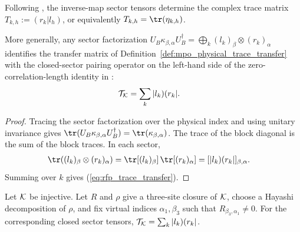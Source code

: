 \begin{definition}
    \label{def:mpdo_concrete_closed_sector_trace_matrix}
    \leanok
    Following \cite[Appendix~C.2, lines~1478--1481]{Cirac2016MPDO_arXiv},
    the inverse-map sector tensors determine the complex trace matrix
    $T_{k,h}:=(r_k|l_h)$, or equivalently $T_{k,h}=\tr(\eta_{k,h})$.
\end{definition}

\begin{lemma}
    \label{thm:mpdo_closed_sector_physical_trace_transfer}
    \leanok
    More generally, any sector factorization
    $U_B\kappa_{\beta,\alpha}U_B^\dagger
        =\bigoplus_k(l_k)_\beta\otimes(r_k)_\alpha$ identifies the transfer
    matrix of Definition~\ref{def:mpo_physical_trace_transfer} with the
    closed-sector pairing operator on the left-hand side of the
    zero-correlation-length identity in
    \cite[Appendix~C.2, lines~1489--1493]{Cirac2016MPDO_arXiv}:
    \begin{align}
        \mathcal T_{\cal K} & =\sum_k |l_k)(r_k|. \label{eq:rfp_trace_transfer}
    \end{align}
\end{lemma}

\begin{proof}
    \leanok
    Tracing the sector factorization over the physical index and using unitary
    invariance gives
    $\tr(U_B\kappa_{\beta,\alpha}U_B^\dagger)
        =\tr(\kappa_{\beta,\alpha})$.
    The trace of the block diagonal is the sum of the block traces. In each
    sector,
    \begin{align}
        \tr((l_k)_\beta\otimes(r_k)_\alpha)
         & =\tr[(l_k)_\beta]\,\tr[(r_k)_\alpha]
            =[|l_k)(r_k|]_{\beta,\alpha}. \notag
    \end{align}
    Summing over $k$ gives (\ref{eq:rfp_trace_transfer}).
\end{proof}

\begin{lemma}
    \label{cor:mpdo_concrete_closed_sector_physical_trace_transfer}
    \leanok
    Let ${\cal K}$ be injective. Let $R$ and $\rho$ give a three-site
    closure of ${\cal K}$, choose a Hayashi decomposition of $\rho$, and fix
    virtual indices $\alpha_1,\beta_3$ such that
    $R_{\beta_3,\alpha_1}\ne0$. For the corresponding closed sector tensors,
    $\mathcal T_{\cal K}=\sum_k |l_k)(r_k|$.
\end{lemma}

